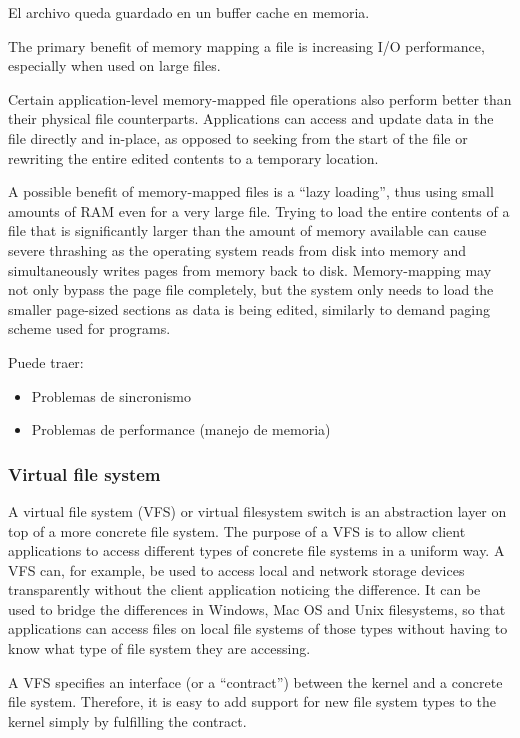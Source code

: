 \documentclass[a4paper, twoside]{article}
\begin{document}
El archivo queda guardado en un buffer cache en memoria.

The primary benefit of memory mapping a file is increasing I/O performance, especially when used on large files.

Certain application-level memory-mapped file operations also perform better than their physical file counterparts. Applications can access and update data in the file directly and in-place, as opposed to seeking from the start of the file or rewriting the entire edited contents to a temporary location.

A possible benefit of memory-mapped files is a ``lazy loading'', thus using small amounts of RAM even for a very large file. Trying to load the entire contents of a file that is significantly larger than the amount of memory available can cause severe thrashing as the operating system reads from disk into memory and simultaneously writes pages from memory back to disk. Memory-mapping may not only bypass the page file completely, but the system only needs to load the smaller page-sized sections as data is being edited, similarly to demand paging scheme used for programs.

Puede traer:
\begin{itemize}
	\item Problemas de sincronismo
	\item Problemas de performance (manejo de memoria)
\end{itemize}

\subsubsection{Virtual file system}
A virtual file system (VFS) or virtual filesystem switch is an abstraction layer on top of a more concrete file system. The purpose of a VFS is to allow client applications to access different types of concrete file systems in a uniform way. A VFS can, for example, be used to access local and network storage devices transparently without the client application noticing the difference. It can be used to bridge the differences in Windows, Mac OS and Unix filesystems, so that applications can access files on local file systems of those types without having to know what type of file system they are accessing.

A VFS specifies an interface (or a ``contract'') between the kernel and a concrete file system. Therefore, it is easy to add support for new file system types to the kernel simply by fulfilling the contract.
\end{document}
